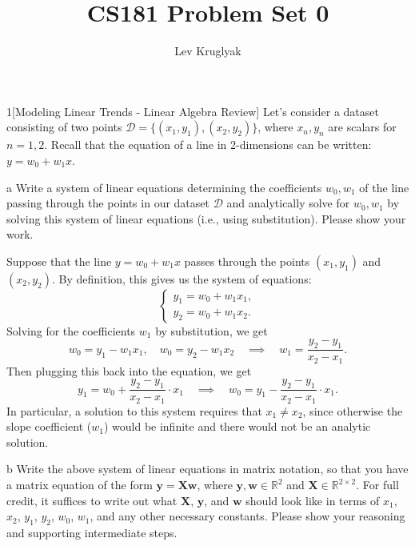 \documentclass[expanded]{pset}
\title{CS181 Problem Set 0}
\author{Lev Kruglyak}
\begin{document}
\maketitle

\begin{problem}{1}[Modeling Linear Trends - Linear Algebra Review]
Let's consider a dataset consisting of two points $\mathcal{D} = \{(x_1, y_1), (x_2, y_2)\}$, where $x_n, y_n$ are scalars for $n=1, 2$. Recall that the equation of a line in 2-dimensions can be written: $y = w_0 + w_1x$. 
\end{problem}

\begin{parts}
  \begin{part}{a}
    Write a system of linear equations determining the coefficients $w_0, w_1$ of the line passing through the points in our dataset $\mathcal{D}$ and analytically solve for $w_0, w_1$ by solving this system of linear equations (i.e., using substitution). Please show your work.
  \end{part}

  Suppose that the line $y= w_0 + w_1x$ passes through the points $(x_1, y_1)$ and $(x_2, y_2)$. By definition, this gives us the system of equations:
  \[
    \begin{cases}
      y_1 = w_0 + w_1 x_1,\\ y_2 = w_0 + w_1 x_2.
    \end{cases}
  \]
  Solving for the coefficients $w_1$ by substitution, we get
  \[
    w_0 = y_1 - w_1x_1, \quad w_0 = y_2 - w_1 x_2 \quad\implies\quad w_1 = \frac{y_2 - y_1}{x_2 - x_1}.
  \]
  Then plugging this back into the equation, we get
  \[
    y_1 = w_0 + \frac{y_2-y_1}{x_2 - x_1}\cdot x_1 \quad\implies\quad w_0 = y_1 - \frac{y_2 - y_1}{x_2 - x_1}\cdot x_1.
  \]
  In particular, a solution to this system requires that $x_1\neq x_2$, since otherwise the slope coefficient ($w_1$) would be infinite and there would not be an analytic solution.

  \begin{part}{b}
    Write the above system of linear equations in matrix notation, so that you have a matrix equation of the form $\mathbf{y} = \mathbf{X}\mathbf{w}$, where $\mathbf{y}, \mathbf{w} \in \mathbb{R}^2$ and $\mathbf{X} \in \mathbb{R}^{2\times 2}$. 
    For full credit, it suffices to write out what $\mathbf{X}$, $\mathbf{y}$, and $\mathbf{w}$ should look like in terms of $x_1$, $x_2$, $y_1$, $y_2$, $w_0$, $w_1$, and any other necessary constants. Please show your reasoning and supporting intermediate steps.
  \end{part}


\end{parts}
\end{document}
